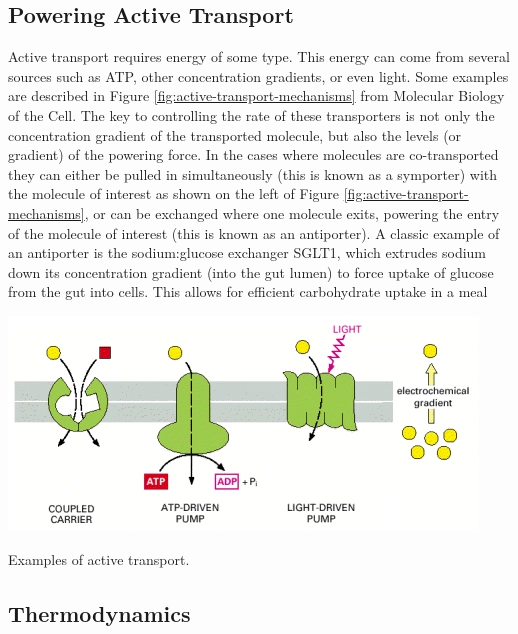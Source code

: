 \documentclass{tufte-handout}
\begin{document}
\subsection{Powering Active Transport}

Active transport requires energy of some type.  This energy can come from several sources such as ATP, other concentration gradients, or even light.  Some examples are described in Figure \ref{fig:active-transport-mechanisms} from Molecular Biology of the Cell\cite{Alberts2002a}.  The key to controlling the rate of these transporters is not only the concentration gradient of the transported molecule, but also the levels (or gradient) of the powering force.  In the cases where molecules are co-transported they can either be pulled in simultaneously (this is known as a symporter) with the molecule of interest as shown on the left of Figure \ref{fig:active-transport-mechanisms}, or can be exchanged where one molecule exits, powering the entry of the molecule of interest (this is known as an antiporter).  A classic example of an antiporter is the sodium:glucose exchanger SGLT1, which extrudes sodium down its concentration gradient (into the gut lumen) to force uptake of glucose from the gut into cells.  This allows for efficient carbohydrate uptake in a meal

\begin{marginfigure}
\includegraphics{figures/active-transport-mechanisms.jpg}\
\caption{Examples of active transport.}
\label{fig:active-transport-mechanisms}
\end{marginfigure}

\subsection{Thermodynamics}
\end{document}

